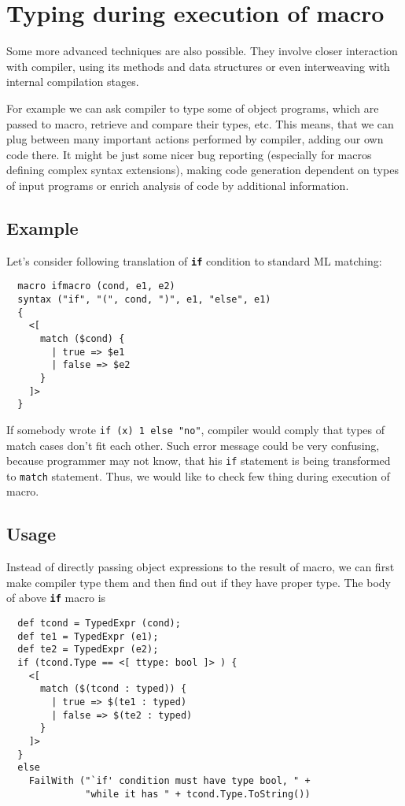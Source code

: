 \documentclass{llncs}
\newcommand{\kw}[1]{{\tt \bf #1}}
\begin{document}
\section{Typing during execution of macro}
Some more advanced techniques are also possible. They involve closer
interaction with compiler, using its methods and data structures
or even interweaving with internal compilation stages.

For example we can ask compiler to type some of object programs,
which are passed to macro, retrieve and compare their types, etc.
 This means, that we can plug between many important 
actions performed by compiler, adding our own code there. It might
be just some nicer bug reporting (especially for macros defining
complex syntax extensions), making code generation dependent on
types of input programs or enrich analysis of code by additional
information.

\subsection{Example}
Let's consider following translation of \kw{if} condition to standard
ML matching:

\begin{verbatim}
  macro ifmacro (cond, e1, e2)
  syntax ("if", "(", cond, ")", e1, "else", e1) 
  {
    <[ 
      match ($cond) {
        | true => $e1
        | false => $e2
      }       
    ]>
  }
\end{verbatim} %

If somebody wrote \verb,if (x) 1 else "no",, compiler would comply
that types of match cases don't fit each other. Such error message could
be very confusing, because programmer may not know, that his \verb,if,
statement is being transformed to \verb,match, statement. Thus, we would
like to check few thing during execution of macro.

\subsection{Usage}
Instead of directly passing object expressions to the result of macro, we
can first make compiler type them and then find out if they have proper
type. The body of above \kw{if} macro is

\begin{verbatim}
  def tcond = TypedExpr (cond);
  def te1 = TypedExpr (e1);
  def te2 = TypedExpr (e2);
  if (tcond.Type == <[ ttype: bool ]> ) {
    <[ 
      match ($(tcond : typed)) { 
        | true => $(te1 : typed) 
        | false => $(te2 : typed) 
      } 
    ]>
  }
  else
    FailWith ("`if' condition must have type bool, " +
              "while it has " + tcond.Type.ToString())
\end{verbatim}
\end{document}

